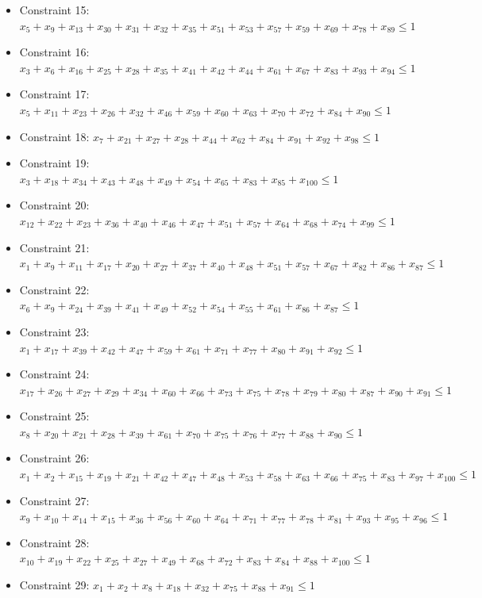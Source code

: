 \documentclass[11pt]{article}
\begin{document}
\begin{itemize}
\item Constraint 15: $x_{5} + x_{9} + x_{13} + x_{30} + x_{31} + x_{32} + x_{35} + x_{51} + x_{53} + x_{57} + x_{59} + x_{69} + x_{78} + x_{89} \le 1$
\item Constraint 16: $x_{3} + x_{6} + x_{16} + x_{25} + x_{28} + x_{35} + x_{41} + x_{42} + x_{44} + x_{61} + x_{67} + x_{83} + x_{93} + x_{94} \le 1$
\item Constraint 17: $x_{5} + x_{11} + x_{23} + x_{26} + x_{32} + x_{46} + x_{59} + x_{60} + x_{63} + x_{70} + x_{72} + x_{84} + x_{90} \le 1$
\item Constraint 18: $x_{7} + x_{21} + x_{27} + x_{28} + x_{44} + x_{62} + x_{84} + x_{91} + x_{92} + x_{98} \le 1$
\item Constraint 19: $x_{3} + x_{18} + x_{34} + x_{43} + x_{48} + x_{49} + x_{54} + x_{65} + x_{83} + x_{85} + x_{100} \le 1$
\item Constraint 20: $x_{12} + x_{22} + x_{23} + x_{36} + x_{40} + x_{46} + x_{47} + x_{51} + x_{57} + x_{64} + x_{68} + x_{74} + x_{99} \le 1$
\item Constraint 21: $x_{1} + x_{9} + x_{11} + x_{17} + x_{20} + x_{27} + x_{37} + x_{40} + x_{48} + x_{51} + x_{57} + x_{67} + x_{82} + x_{86} + x_{87} \le 1$
\item Constraint 22: $x_{6} + x_{9} + x_{24} + x_{39} + x_{41} + x_{49} + x_{52} + x_{54} + x_{55} + x_{61} + x_{86} + x_{87} \le 1$
\item Constraint 23: $x_{1} + x_{17} + x_{39} + x_{42} + x_{47} + x_{59} + x_{61} + x_{71} + x_{77} + x_{80} + x_{91} + x_{92} \le 1$
\item Constraint 24: $x_{17} + x_{26} + x_{27} + x_{29} + x_{34} + x_{60} + x_{66} + x_{73} + x_{75} + x_{78} + x_{79} + x_{80} + x_{87} + x_{90} + x_{91} \le 1$
\item Constraint 25: $x_{8} + x_{20} + x_{21} + x_{28} + x_{39} + x_{61} + x_{70} + x_{75} + x_{76} + x_{77} + x_{88} + x_{90} \le 1$
\item Constraint 26: $x_{1} + x_{2} + x_{15} + x_{19} + x_{21} + x_{42} + x_{47} + x_{48} + x_{53} + x_{58} + x_{63} + x_{66} + x_{75} + x_{83} + x_{97} + x_{100} \le 1$
\item Constraint 27: $x_{9} + x_{10} + x_{14} + x_{15} + x_{36} + x_{56} + x_{60} + x_{64} + x_{71} + x_{77} + x_{78} + x_{81} + x_{93} + x_{95} + x_{96} \le 1$
\item Constraint 28: $x_{10} + x_{19} + x_{22} + x_{25} + x_{27} + x_{49} + x_{68} + x_{72} + x_{83} + x_{84} + x_{88} + x_{100} \le 1$
\item Constraint 29: $x_{1} + x_{2} + x_{8} + x_{18} + x_{32} + x_{75} + x_{88} + x_{91} \le 1$

\end{itemize}
\end{document}
